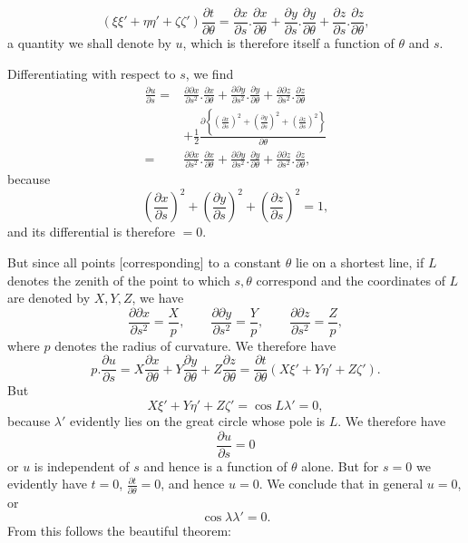 %
\[
(\xi\xi'+\eta\eta'+\zeta\zeta')\frac{\partial t}{\partial\theta}=\frac{\partial x}{\partial s}.\frac{\partial x}{\partial\theta}+\frac{\partial y}{\partial s}.\frac{\partial y}{\partial\theta}+\frac{\partial z}{\partial s}.\frac{\partial z}{\partial\theta},
\]
a quantity we shall denote by $u$, which is therefore itself a function of $\theta$ and $s$.

Differentiating with respect to $s$, we find
\[
\begin{aligned}
\frac{\partial u}{\partial s}={}&\frac{\partial\partial x}{\partial s^{2}}.\frac{\partial x}{\partial\theta}+\frac{\partial\partial y}{\partial s^{2}}.\frac{\partial y}{\partial\theta}+\frac{\partial\partial z}{\partial s^{2}}.\frac{\partial z}{\partial\theta}\\
&+\tfrac12\frac{\partial\left\{\left(\frac{\partial x}{\partial s}\right)^{2}+\left(\frac{\partial y}{\partial s}\right)^{2}+\left(\frac{\partial z}{\partial s}\right)^{2}\right\}}{\partial\theta}\\
={}&\frac{\partial\partial x}{\partial s^{2}}.\frac{\partial x}{\partial\theta}+\frac{\partial\partial y}{\partial s^{2}}.\frac{\partial y}{\partial\theta}+\frac{\partial\partial z}{\partial s^{2}}.\frac{\partial z}{\partial\theta},
\end{aligned}
\]
because
\[
\left(\frac{\partial x}{\partial s}\right)^{2}+\left(\frac{\partial y}{\partial s}\right)^{2}+\left(\frac{\partial z}{\partial s}\right)^{2}=1,
\]
and its differential is therefore $=0$.

But since all points [corresponding] to a constant $\theta$ lie on a shortest line, if $L$ denotes the zenith of the point to which $s,\theta$ correspond and the coordinates of $L$ are denoted by $X,Y,Z$, we have
\[
\frac{\partial\partial x}{\partial s^{2}}=\frac{X}{p},\qquad\frac{\partial\partial y}{\partial s^{2}}=\frac{Y}{p},\qquad\frac{\partial\partial z}{\partial s^{2}}=\frac{Z}{p},
\]
where $p$ denotes the radius of curvature. We therefore have
\[
p.\frac{\partial u}{\partial s}=X\frac{\partial x}{\partial\theta}+Y\frac{\partial y}{\partial\theta}+Z\frac{\partial z}{\partial\theta}=\frac{\partial t}{\partial\theta}(X\xi'+Y\eta'+Z\zeta').
\]
But
\[
X\xi'+Y\eta'+Z\zeta'=\cos L\lambda'=0,
\]
because $\lambda'$ evidently lies on the great circle whose pole is $L$. We therefore have
\[
\frac{\partial u}{\partial s}=0
\]
or $u$ is independent of $s$ and hence is a function of $\theta$ alone. But for $s=0$ we evidently have $t=0$, $\frac{\partial t}{\partial\theta}=0$, and hence $u=0$. We conclude that in general $u=0$, or
\[
\cos\lambda\lambda'=0.
\]
From this follows the beautiful theorem:
